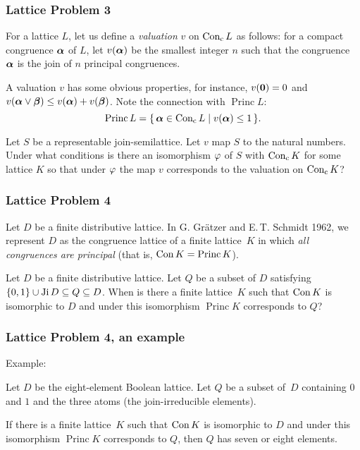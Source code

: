 \documentclass[leqno]{beamer}
\DeclareMathOperator{\Princ}{Princ}
\DeclareMathOperator{\Conc}{\tup{Con}_\tup{c}}
\begin{document}
\begin{frame}
\frametitle{Lattice Problem 3}
For a lattice $L$, let us define a \emph{valuation} $v$ 
on $\Conc L$ as follows: 
for a compact congruence $\bga$ of $L$, 
let $v(\bga)$ be the smallest integer $n$
such that the congruence $\bga$ is the join of $n$ principal congruences.

A valuation $v$ has some obvious properties, for instance,
$v(\mathbf{0}) = 0$ and $v(\bga \jj \bgb) \leq v(\bga) + v(\bgb)$.
Note the connection with $\Princ L$:
\[
   \Princ L = \setm{\bga \in \Conc L}{v(\bga) \leq 1}.
\]
\pause
\begin{problem}
Let $S$ be a representable join-semilattice. 
Let $v$ map $S$ to the natural numbers.
Under what conditions is there an isomorphism $\gf$
of $S$ with $\Conc K$ for some lattice $K$
so that under $\gf$ the map $v$ corresponds 
to the valuation on $\Conc K$?
\end{problem}
\end{frame}

\begin{frame}
\frametitle{Lattice Problem 4}
Let $D$ be a finite distributive lattice.
In G. Gr\"atzer and E.\,T. Schmidt 1962,
we represent $D$ as the congruence lattice
of a finite lattice~$K$ in which 
\emph{all congruences are principal} (that is, $\Con K = \Princ K$).
\pause
\begin{problem}
Let $D$ be a finite distributive lattice. 
Let $Q$ be a subset of $D$ satisfying
$\{0, 1\} \cup \operatorname{Ji} D \subseteq Q \subseteq D$.
When is there a finite lattice~$K$ such 
that $\operatorname{Con} K$ is isomorphic to $D$
and under this isomorphism $\Princ K$ 
corresponds to $Q$?
\end{problem}
\end{frame}

\begin{frame}
\frametitle{Lattice Problem 4, an example}

Example:

Let $D$ be the eight-element Boolean lattice.
Let $Q$ be a subset of~$D$ containing
$0$ and $1$ and the three atoms (the join-irreducible elements).


\begin{lemma}
If there is a finite lattice~$K$ such 
that $\operatorname{Con} K$ is isomorphic to $D$
and under this isomorphism $\Princ K$ 
corresponds to $Q$,
then $Q$ has seven or eight elements.\end{lemma}


\end{frame}
\end{document}
